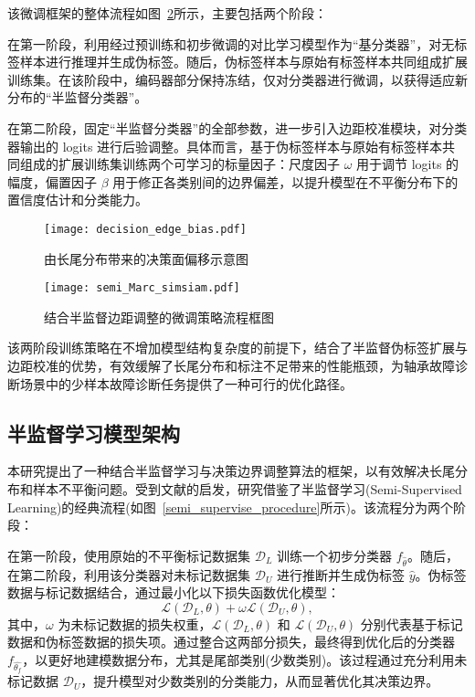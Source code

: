 \documentclass[master]{thesis-uestc}
\begin{document}
该微调框架的整体流程如图~\ref{semi_Marc_simsiam}所示，主要包括两个阶段：

在第一阶段，利用经过预训练和初步微调的对比学习模型作为“基分类器”，对无标签样本进行推理并生成伪标签。随后，伪标签样本与原始有标签样本共同组成扩展训练集。在该阶段中，编码器部分保持冻结，仅对分类器进行微调，以获得适应新分布的“半监督分类器”。

在第二阶段，固定“半监督分类器”的全部参数，进一步引入边距校准模块，对分类器输出的 logits 进行后验调整。具体而言，基于伪标签样本与原始有标签样本共同组成的扩展训练集训练两个可学习的标量因子：尺度因子 $\omega$ 用于调节 logits 的幅度，偏置因子 $\beta$ 用于修正各类别间的边界偏差，以提升模型在不平衡分布下的置信度估计和分类能力。


\begin{figure}[H]
    \centering
    \texttt{[image: decision\_edge\_bias.pdf]}
    \caption{由长尾分布带来的决策面偏移示意图}
    \label{decision_edge_bias}
\end{figure}

\begin{figure}[H]
    \centering
    \texttt{[image: semi\_Marc\_simsiam.pdf]}
    \caption{结合半监督边距调整的微调策略流程框图}
    \label{semi_Marc_simsiam}
\end{figure}

该两阶段训练策略在不增加模型结构复杂度的前提下，结合了半监督伪标签扩展与边距校准的优势，有效缓解了长尾分布和标注不足带来的性能瓶颈，为轴承故障诊断场景中的少样本故障诊断任务提供了一种可行的优化路径。

\subsection{半监督学习模型架构}
本研究提出了一种结合半监督学习与决策边界调整算法的框架，以有效解决长尾分布和样本不平衡问题。受到文献\cite{yang2020rethinking,wang2023margin}的启发，研究借鉴了半监督学习(Semi-Supervised Learning)的经典流程(如图~\ref{semi_supervise_procedure}所示)。该流程分为两个阶段：

在第一阶段，使用原始的不平衡标记数据集 $\mathcal{D}_{L}$ 训练一个初步分类器 $f_{\hat{\theta}}$。随后，在第二阶段，利用该分类器对未标记数据集 $\mathcal{D}_{U}$ 进行推断并生成伪标签 $\hat{y}$。伪标签数据与标记数据结合，通过最小化以下损失函数优化模型：
\begin{equation} 
    \mathcal{L}(\mathcal{D}_{L},\theta) + \omega \mathcal{L}(\mathcal{D}_{U},\theta), 
    \label{eq:semi_loss}
\end{equation}
其中，$\omega$ 为未标记数据的损失权重，$\mathcal{L}(\mathcal{D}_{L},\theta)$ 和 $\mathcal{L}(\mathcal{D}_{U},\theta)$ 分别代表基于标记数据和伪标签数据的损失项。通过整合这两部分损失，最终得到优化后的分类器 $f_{\hat{\theta_f}}$，以更好地建模数据分布，尤其是尾部类别(少数类别)。该过程通过充分利用未标记数据 $\mathcal{D}_{U}$，提升模型对少数类别的分类能力，从而显著优化其决策边界。
\end{document}
